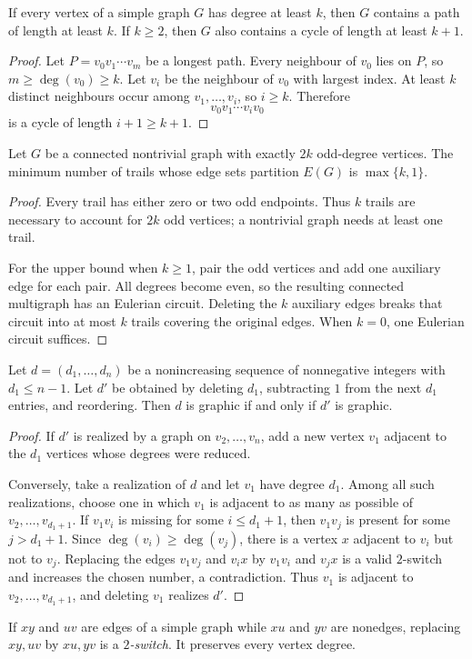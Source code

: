 \begin{notetheorem}
If every vertex of a simple graph $G$ has degree at least $k$, then $G$ contains a path of length at least $k$.  If $k\ge2$, then $G$ also contains a cycle of length at least $k+1$.
\end{notetheorem}
\begin{proof}
Let $P=v_0v_1\cdots v_m$ be a longest path.  Every neighbour of $v_0$ lies on $P$, so $m\ge\deg(v_0)\ge k$.  Let $v_i$ be the neighbour of $v_0$ with largest index.  At least $k$ distinct neighbours occur among $v_1,\ldots,v_i$, so $i\ge k$.  Therefore
\[
  v_0v_1\cdots v_iv_0
\]
is a cycle of length $i+1\ge k+1$.
\end{proof}
\begin{notetheorem}
Let $G$ be a connected nontrivial graph with exactly $2k$ odd-degree vertices.  The minimum number of trails whose edge sets partition $E(G)$ is $\max\{k,1\}$.
\end{notetheorem}
\begin{proof}
Every trail has either zero or two odd endpoints.  Thus $k$ trails are necessary to account for $2k$ odd vertices; a nontrivial graph needs at least one trail.

For the upper bound when $k\ge1$, pair the odd vertices and add one auxiliary edge for each pair.  All degrees become even, so the resulting connected multigraph has an Eulerian circuit.  Deleting the $k$ auxiliary edges breaks that circuit into at most $k$ trails covering the original edges.  When $k=0$, one Eulerian circuit suffices.
\end{proof}

\begin{notetheorem}
Let $d=(d_1,\ldots,d_n)$ be a nonincreasing sequence of nonnegative integers with $d_1\le n-1$.  Let $d'$ be obtained by deleting $d_1$, subtracting $1$ from the next $d_1$ entries, and reordering.  Then $d$ is graphic if and only if $d'$ is graphic.
\end{notetheorem}
\begin{proof}
If $d'$ is realized by a graph on $v_2,\ldots,v_n$, add a new vertex $v_1$ adjacent to the $d_1$ vertices whose degrees were reduced.

Conversely, take a realization of $d$ and let $v_1$ have degree $d_1$.  Among all such realizations, choose one in which $v_1$ is adjacent to as many as possible of $v_2,\ldots,v_{d_1+1}$.  If $v_1v_i$ is missing for some $i\le d_1+1$, then $v_1v_j$ is present for some $j>d_1+1$.  Since $\deg(v_i)\ge\deg(v_j)$, there is a vertex $x$ adjacent to $v_i$ but not to $v_j$.  Replacing the edges $v_1v_j$ and $v_ix$ by $v_1v_i$ and $v_jx$ is a valid $2$-switch and increases the chosen number, a contradiction.  Thus $v_1$ is adjacent to $v_2,\ldots,v_{d_1+1}$, and deleting $v_1$ realizes $d'$.
\end{proof}
\begin{notedefinition}[2-switch]
If $xy$ and $uv$ are edges of a simple graph while $xu$ and $yv$ are nonedges, replacing $xy,uv$ by $xu,yv$ is a \emph{$2$-switch}.  It preserves every vertex degree.
\end{notedefinition}

